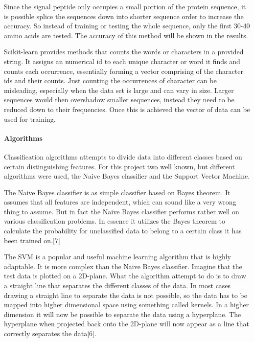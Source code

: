 \documentclass[10pt,letterpaper]{article}
\begin{document}
Since the signal peptide only occupies a small portion of the protein sequence, it is possible splice the sequences down into shorter sequence order to increase the accuracy. So instead of training or testing the whole sequence, only the first 30-40 amino acids are tested. The accuracy of this method will be shown in the results. 

Scikit-learn provides methods that counts the words or characters in a provided string. It assigns an numerical id to each unique character or word it finds and counts each occurrence, essentially forming a vector comprising of the character ids and their counts. Just counting the occurrences of character can be misleading, especially when the data set is large and can vary in size. Larger sequences would then overshadow smaller sequences, instead they need to be reduced down to their frequencies. Once this is achieved the vector of data can be used for training. 

\paragraph*{Algorithms}
Classification algorithms attempts to divide data into different classes based on certain distinguishing features. For this project two well known, but different algorithms were used, the Naive Bayes classifier and the Support Vector Machine. 

The Naive Bayes classifier is as simple classifier based on Bayes theorem. It assumes that all features are independent, which can sound like a very wrong thing to assume. But in fact the Naive Bayes classifier performs rather well on various classification problems. In essence it utilizes the Bayes theorem to calculate the probability for unclassified data to belong to a certain class it has been trained on.[7]

The SVM is a popular and useful machine learning algorithm that is highly adaptable. It is more complex than the Naive Bayes classifier. Imagine that the test data is plotted on a 2D-plane. What the algorithm attempt to do is to draw a straight line that separates the different classes of the data. In most cases drawing a straight line to separate the data is not possible, so the data has to be mapped into higher dimensional space using something called kernels. In a higher dimension it will now be possible to separate the data using a hyperplane. The hyperplane when projected back onto the 2D-plane will now appear as a line that correctly separates the data[6]. 
\end{document}
